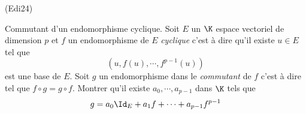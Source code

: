 \begin{tiny}(Edi24)\end{tiny} Commutant d'un endomorphisme cyclique.\newline
Soit $E$ un $\K$ espace vectoriel de dimension $p$ et $f$ un endomorphisme de $E$ \emph{cyclique} c'est à dire qu'il existe $u\in E$ tel que
\begin{displaymath}
  \left(u, f(u), \cdots, f^{p-1}(u) \right) 
\end{displaymath}
est une base de $E$.
Soit $g$ un endomorphisme dans le \emph{commutant} de $f$ c'est à dire tel que $f\circ g = g\circ f$. Montrer qu'il existe $a_0,\cdots, a_{p-1}$ dans $\K$ tels que 
\begin{displaymath}
  g = a_0\Id_E + a_1 f + \cdots + a_{p-1} f^{p-1}
\end{displaymath}
